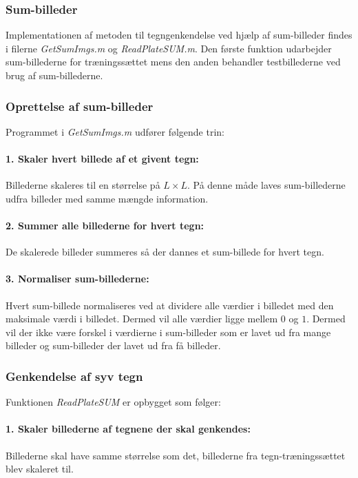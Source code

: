 \subsubsection{Sum-billeder}

Implementationen af metoden til tegngenkendelse ved hjælp af sum-billeder findes i filerne \textit{GetSumImgs.m} og \textit{ReadPlateSUM.m}. Den første funktion udarbejder sum-billederne for træningssættet mens den anden behandler testbillederne ved brug af sum-billederne.

\subsubsection*{Oprettelse af sum-billeder}
Programmet i \textit{GetSumImgs.m} udfører følgende trin:

\paragraph{1. Skaler hvert billede af et givent tegn:} Billederne skaleres til en størrelse på $L \times L$. På denne måde laves sum-billederne udfra billeder med samme mængde information.

\paragraph{2. Summer alle billederne for hvert tegn:} De skalerede billeder summeres så der dannes et sum-billede for hvert tegn.

\paragraph{3. Normaliser sum-billederne:} Hvert sum-billede normaliseres ved at dividere alle værdier i billedet med den maksimale værdi i billedet. Dermed vil alle værdier ligge mellem $0$ og $1$. Dermed vil der ikke være forskel i værdierne i sum-billeder som er lavet ud fra mange billeder og sum-billeder der lavet ud fra få billeder.

\subsubsection*{Genkendelse af syv tegn}

Funktionen \textit{ReadPlateSUM} er opbygget som følger:

\paragraph{1. Skaler billederne af tegnene der skal genkendes:} Billederne skal have samme størrelse som det, billederne fra tegn-træningssættet blev skaleret til.

